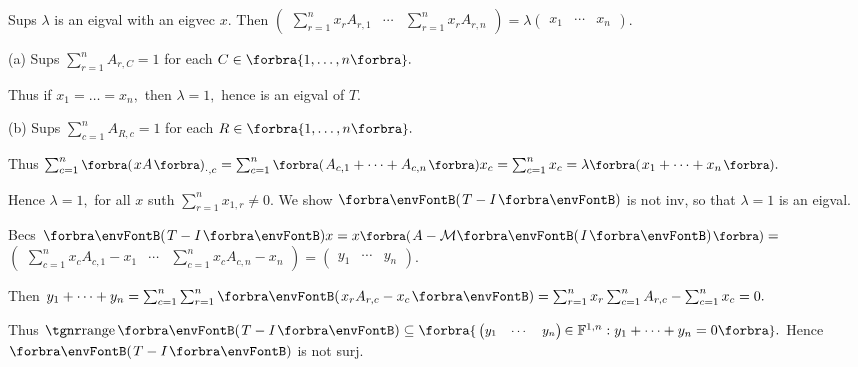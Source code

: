 \par\quad
Sups $\lambda$ is an eigval with an eigvec $x.$ Then {\normalsize$\begin{pmatrix} \sum_{r=1}^n x_r A_{r,1} &\cdots & \sum_{r=1}^n x_r A_{r,n}\end{pmatrix}$}${}=\lambda${\normalsize$\begin{pmatrix} x_1 & \cdots & x_n\end{pmatrix}$}.\vspace{4pt}\par\quad
(a) Sups $\sum_{r=1}^n A_{r,C}=1$ for each $C\in\Bra{1,\dots,n}.$\par\quad\Ha
Thus if $x_1=\dots=x_n,$ then $\lambda=1,$ hence is an eigval of $T.$\vspace{4pt}\par\quad
(b) Sups $\sum_{c=1}^n A_{R,c}=1$ for each $R\in\Bra{1,\dots,n}.$\vspace{2pt}\par\quad\Hb
Thus $\sum_{c=1}^n \BigPar{xA}_{\cdot,c}=\sum_{c=1}^n\BigPar{A_{c,1}+\dots+A_{c,n}}x_c=\sum_{c=1}^n x_c=\lambda\BigPar{x_1+\dots+x_n}.$\vspace{2pt}\par\quad\Hb
Hence $\lambda=1,$ for all $x$ suth $\sum_{r=1}^n x_{1,r}\neq 0.$\PfEnd\vspace{6pt}\quad\Hb
\Or We show $\Par{T-I}$ is not inv, so that $\lambda=1$ is an eigval.\par\quad\Hb
Becs $\Par{T-I}x=x\BigPar{A-\Mt{I}}={}${\normalsize$\begin{pmatrix} \sum_{c=1}^n x_c A_{c,1}-x_1 &\cdots & \sum_{c=1}^n x_c A_{c,n}-x_n\end{pmatrix}$}${}={}${\normalsize$\begin{pmatrix} y_1 & \cdots & y_n\end{pmatrix}$}.\vspace{2pt}\par\quad\Hb
Then $y_1+\dots+y_n=\sum_{c=1}^n\sum_{r=1}^n\Par{x_r A_{r,c}-x_c}=\sum_{r=1}^n x_r\sum_{c=1}^n A_{r,c}-\sum_{c=1}^n x_c=0.$\par\vspace{4pt}\quad\Hb
Thus $\range\Par{T-I}\subseteq\Bra{\,${\small$\begin{pmatrix}y_1 & \cdots & y_n\end{pmatrix}$}$\,\in\Fbb^{1,n}:y_1+\dots+y_n=0}.$ Hence $\Par{T-I}$ is not surj.\PfEnd\vspace{6pt}\quad\Hb
